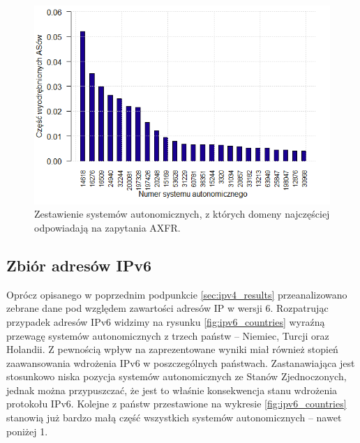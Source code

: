 \begin{figure}[ht]
	\centering
	\includegraphics[width=1.0\textwidth]{image/asn_all_no_title}
	\caption{Zestawienie systemów autonomicznych, z których domeny najczęściej odpowiadają na zapytania AXFR.}
	\label{fig:asn_all}
\end{figure}

\subsection{Zbiór adresów IPv6}
Oprócz opisanego w poprzednim podpunkcie \ref{sec:ipv4_results} przeanalizowano zebrane dane pod względem zawartości adresów IP
w wersji 6. Rozpatrując przypadek adresów IPv6 widzimy na rysunku \ref{fig:ipv6_countries} wyraźną przewagę systemów autonomicznych
z trzech państw -- Niemiec, Turcji oraz Holandii. Z pewnością wpływ na zaprezentowane wyniki miał również stopień zaawansowania
wdrożenia IPv6 w poszczególnych państwach. Zastanawiająca jest stosunkowo niska pozycja systemów autonomicznych ze Stanów Zjednoczonych,
jednak można przypuszczać, że jest to właśnie konsekwencja stanu wdrożenia protokołu IPv6. Kolejne z państw przestawione na
wykresie \ref{fig:ipv6_countries} stanowią już bardzo małą część wszystkich systemów autonomicznych -- nawet poniżej 1\textperthousand.


